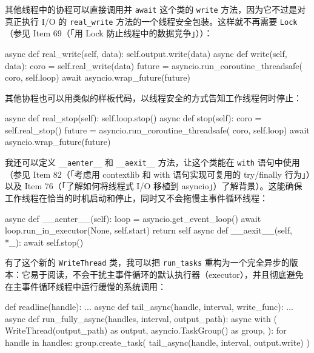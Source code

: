 其他线程中的协程可以直接调用并 \texttt{await} 这个类的 \texttt{write} 方法，因为它不过是对真正执行 I/O 的 \texttt{real\_write} 方法的一个线程安全包装。这样就不再需要 \texttt{Lock}（参见 Item 69（「用 Lock 防止线程中的数据竞争」））：

\begin{codebox}[python]
    async def real_write(self, data):
        self.output.write(data)
    async def write(self, data):
        coro = self.real_write(data)
        future = asyncio.run_coroutine_threadsafe(
            coro, self.loop)
        await asyncio.wrap_future(future)
\end{codebox}

其他协程也可以用类似的样板代码，以线程安全的方式告知工作线程何时停止：

\begin{codebox}[python]
    async def real_stop(self):
        self.loop.stop()
    async def stop(self):
        coro = self.real_stop()
        future = asyncio.run_coroutine_threadsafe(
            coro, self.loop)
        await asyncio.wrap_future(future)
\end{codebox}

我还可以定义 \texttt{\_\_aenter\_\_} 和 \texttt{\_\_aexit\_\_} 方法，让这个类能在 \texttt{with} 语句中使用（参见 Item 82（「考虑用 contextlib 和 with 语句实现可复用的 try/finally 行为」）以及 Item 76（「了解如何将线程式 I/O 移植到 asyncio」）了解背景）。这能确保工作线程在恰当的时机启动和停止，同时又不会拖慢主事件循环线程：

\begin{codebox}[python]
    async def __aenter__(self):
        loop = asyncio.get_event_loop()
        await loop.run_in_executor(None, self.start)
        return self
    async def __aexit__(self, *_):
        await self.stop()
\end{codebox}

有了这个新的 \texttt{WriteThread} 类，我可以把 \texttt{run\_tasks} 重构为一个完全异步的版本：它易于阅读，不会干扰主事件循环的默认执行器（executor），并且彻底避免在主事件循环线程中运行缓慢的系统调用：

\begin{codebox}[python]
def readline(handle):
    ...
async def tail_async(handle, interval, write_func):
    ...
async def run_fully_async(handles, interval, output_path):
    async with (
        WriteThread(output_path) as output,
        asyncio.TaskGroup() as group,
    ):
        for handle in handles:
            group.create_task(
                tail_async(handle, interval, output.write)
            )
\end{codebox}

